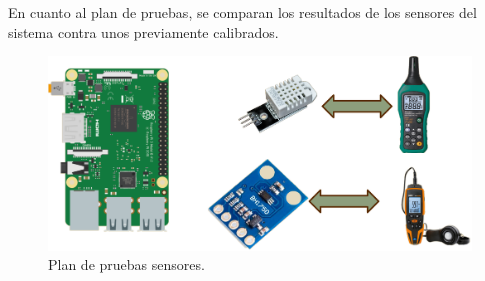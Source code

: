 %

En cuanto al plan de pruebas, se comparan los resultados de los sensores del sistema contra unos previamente calibrados.
\begin{figure}[H]
	\centering
	\includegraphics[width=0.8\linewidth]{ImagenesIngenieria de Detalle/planDePruebasSensores}	
	\caption{Plan de pruebas sensores.}
	\label{fig:planDePruebasSensores}
\end{figure}